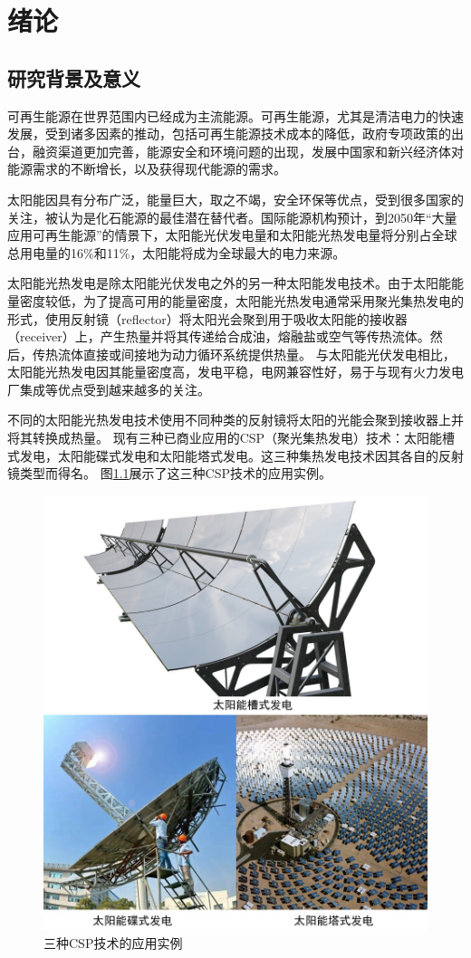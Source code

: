 \chapter{绪论}
\label{chapter:Introduction}

\section{研究背景及意义}

可再生能源在世界范围内已经成为主流能源。可再生能源，尤其是清洁电力的快速发展，受到诸多因素的推动，包括可再生能源技术成本的降低，政府专项政策的出台，融资渠道更加完善，能源安全和环境问题的出现，发展中国家和新兴经济体对能源需求的不断增长，以及获得现代能源的需求。

太阳能因具有分布广泛，能量巨大，取之不竭，安全环保等优点，受到很多国家的关注，被认为是化石能源的最佳潜在替代者。国际能源机构预计，到2050年“大量应用可再生能源”的情景下，太阳能光伏发电量和太阳能光热发电量将分别占全球总用电量的16\%和11\%，太阳能将成为全球最大的电力来源\cite{IEA2014}。

太阳能光热发电是除太阳能光伏发电之外的另一种太阳能发电技术。由于太阳能能量密度较低，为了提高可用的能量密度，太阳能光热发电通常采用聚光集热发电的形式，使用反射镜（reflector）将太阳光会聚到用于吸收太阳能的接收器（receiver）上，产生热量并将其传递给合成油，熔融盐或空气等传热流体。然后，传热流体直接或间接地为动力循环系统提供热量。
与太阳能光伏发电相比，太阳能光热发电因其能量密度高，发电平稳，电网兼容性好，易于与现有火力发电厂集成等优点受到越来越多的关注。

不同的太阳能光热发电技术使用不同种类的反射镜将太阳的光能会聚到接收器上并将其转换成热量。
现有三种已商业应用的CSP（聚光集热发电）技术：太阳能槽式发电，太阳能碟式发电和太阳能塔式发电。这三种集热发电技术因其各自的反射镜类型而得名。
图\ref{fig:collectors}展示了这三种CSP技术的应用实例。
\begin{figure}[!ht]
\centering
\includegraphics[width=.8\textwidth]{fig/Collectors}
\caption{三种CSP技术的应用实例}\label{fig:collectors}
\end{figure}

